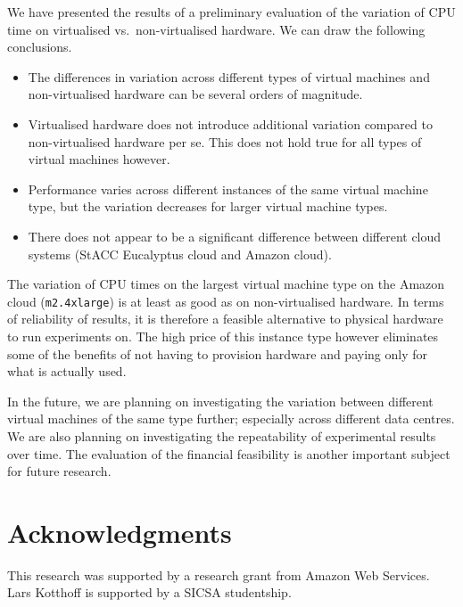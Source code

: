 \documentclass{llncs}
\begin{document}
We have presented the results of a preliminary evaluation of the variation of
CPU time on virtualised vs.\ non-virtualised hardware. We can draw the following
conclusions.
\begin{itemize}
\item The differences in variation across different types of virtual machines
    and non-virtualised hardware can be several orders of magnitude.
\item Virtualised hardware does not introduce additional variation compared to
    non-virtualised hardware per se. This does not hold true for all types of
    virtual machines however.
\item Performance varies across different instances of the same virtual machine
    type, but the variation decreases for larger virtual machine types.
\item There does not appear to be a significant difference between different
    cloud systems (StACC Eucalyptus cloud and Amazon cloud).
\end{itemize}

The variation of CPU times on the largest virtual machine type on the Amazon
cloud (\texttt{m2.4xlarge}) is at least as good as on non-virtualised hardware.
In terms of reliability of results, it is therefore a feasible alternative to
physical hardware to run experiments on. The high price of this instance type
however eliminates some of the benefits of not having to provision hardware and
paying only for what is actually used.

In the future, we are planning on investigating the variation between different
virtual machines of the same type further; especially across different data
centres. We are also planning on investigating the repeatability of
experimental results over time. The evaluation of the financial feasibility is
another important subject for future research.


\section*{Acknowledgments}

This research was supported by a research grant from Amazon Web Services. Lars
Kotthof\/f is supported by a SICSA studentship.


\renewcommand\bibname{References}

\end{document}
